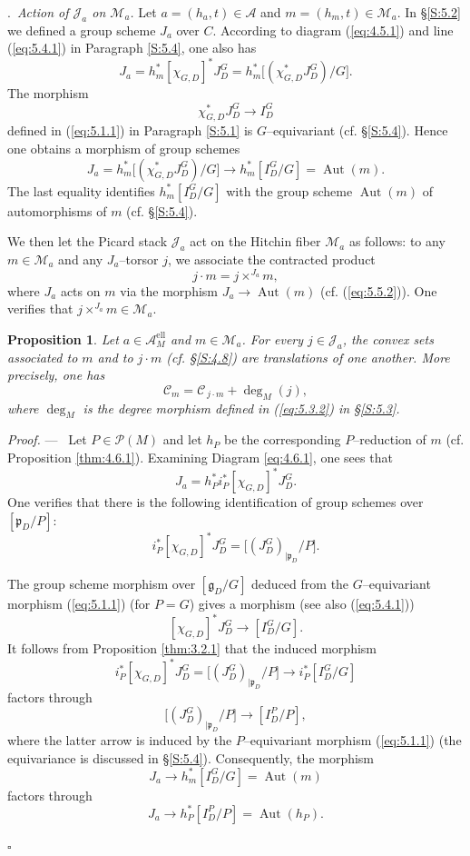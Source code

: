 \documentclass[12pt,a4paper,oneside,english,leqno]{smfart}
\makeatletter
\numberwithin{equation}{subsection}
\newcounter{theo}
\numberwithin{theo}{subsection}
\newenvironment{paragr}[1][]{\medskip\refstepcounter{subsection}%
  \par\noindent\hspace*{\parindent}\thesubsection.\ \emph{#1}%
  \@ifundefined{@empty}{}{}\ignorespaces}{\medskip}
\theoremstyle{plain}
\newtheorem{proposition}[theo]{Proposition}
\theoremstyle{definition}
\theoremstyle{remark}
\newenvironment{preuve}[1][]{\medskip\noindent\textit{Proof.} #1 ---\ }%
  {\hfill\ensuremath{\square}\medskip}
\DeclareMathOperator{\el}{ell}
\DeclareMathOperator{\Aut}{Aut}
\newcommand{\mc}{\mathcal{M}}
\newcommand{\pc}{\mathcal{P}}
\newcommand{\Ac}{\mathcal{A}}
\newcommand{\Jc}{\mathcal{J}}
\newcommand{\ggo}{\mathfrak{g}}
\newcommand{\pgo}{\mathfrak{p}}
\makeatother
\begin{document}
\begin{paragr}[Action of $\Jc_a$ on $\mc_a$.]\label{S:5.5}
Let $a=(h_a,t)\in \Ac$ and $m=(h_m,t)\in \mc_a$. In §\ref{S:5.2} we defined a group scheme $J_a$ over $C$. According to diagram (\ref{eq:4.5.1}) and line (\ref{eq:5.4.1}) in Paragraph \ref{S:5.4}, one also has
\begin{equation}\label{eq:5.5.1}
J_a=h_m^* [\chi_{G,D}]^*J_D^G = h_m^*\bigl[(\chi_{G,D}^* J^G_D)/G\bigr].
\end{equation}
The morphism
$$\chi_{G,D}^* J^G_D \to I^G_D$$
defined in (\ref{eq:5.1.1}) in Paragraph \ref{S:5.1} is $G$–equivariant (cf. §\ref{S:5.4}). Hence one obtains a morphism of group schemes
\begin{equation}\label{eq:5.5.2}
  J_a = h_m^*\bigl[(\chi_{G,D}^* J^G_D)/G\bigr] \to h_m^*[I^G_D/G] = \Aut(m).
\end{equation}
The last equality identifies $h_m^*[I^G_D/G]$ with the group scheme $\Aut(m)$ of automorphisms of $m$ (cf. §\ref{S:5.4}).

We then let the Picard stack $\Jc_a$ act on the Hitchin fiber $\mc_a$ as follows: to any $m\in \mc_a$ and any $J_a$–torsor $j$, we associate the contracted product
$$j\cdot m = j\times^{J_a} m,$$
where $J_a$ acts on $m$ via the morphism $J_a \to \Aut(m)$ (cf. (\ref{eq:5.5.2})). One verifies that $j\times^{J_a} m \in \mc_a$.

\begin{proposition}\label{thm:5.5.1}
Let $a\in \Ac_M^{\el}$ and $m\in \mc_a$. For every $j\in \Jc_a$, the convex sets associated to $m$ and to $j\cdot m$ (cf. §\ref{S:4.8}) are translations of one another. More precisely, one has
$$\mathcal{C}_m = \mathcal{C}_{\, j\cdot m} + \deg_M(j),$$
where $\deg_M$ is the degree morphism defined in (\ref{eq:5.3.2}) in §\ref{S:5.3}.
\end{proposition}

\begin{preuve}
Let $P\in \pc(M)$ and let $h_P$ be the corresponding $P$–reduction of $m$ (cf. Proposition \ref{thm:4.6.1}). Examining Diagram \ref{eq:4.6.1}, one sees that
$$ J_a = h_P^* i_P^* [\chi_{G,D}]^* J_D^G.$$
One verifies that there is the following identification of group schemes over $[\pgo_D/P]$:
$$ i_P^* [\chi_{G,D}]^* J_D^G = \bigl[(J^G_D)_{|\pgo_D}/P\bigr].$$

The group scheme morphism over $[\ggo_D/G]$ deduced from the $G$–equivariant morphism (\ref{eq:5.1.1}) (for $P=G$) gives a morphism (see also (\ref{eq:5.4.1}))
$$ [\chi_{G,D}]^* J_D^G \to [I^G_D/G].$$
It follows from Proposition \ref{thm:3.2.1} that the induced morphism
$$ i_P^* [\chi_{G,D}]^* J_D^G = \bigl[(J^G_D)_{|\pgo_D}/P\bigr] \to i_P^*[I^G_D/G] $$
factors through
$$ \bigl[(J^G_D)_{|\pgo_D}/P\bigr] \to [I^P_D/P],$$
where the latter arrow is induced by the $P$–equivariant morphism (\ref{eq:5.1.1}) (the equivariance is discussed in §\ref{S:5.4}). Consequently, the morphism
$$J_a \to h_m^*[I^G_D/G] = \Aut(m)$$
factors through
\begin{equation}\label{eq:5.5.3}
  J_a \to h_P^*[I^P_D/P] = \Aut(h_P).
\end{equation}


\end{preuve}
\end{paragr}
\end{document}
